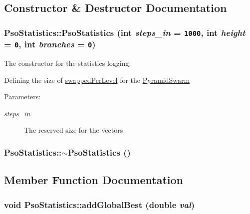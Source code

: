 \subsection{Constructor \& Destructor Documentation}
\hypertarget{classPsoStatistics_33694c00160dc114f263bd4bb53ad326}{
\subsubsection{\setlength{\rightskip}{0pt plus 5cm}PsoStatistics::PsoStatistics (int {\em steps\_\-in} = {\tt 1000}, \/  int {\em height} = {\tt 0}, \/  int {\em branches} = {\tt 0})}}
\label{classPsoStatistics_33694c00160dc114f263bd4bb53ad326}


The constructor for the statistics logging. 

Defining the size of \hyperlink{classPsoStatistics_77332ba8e781b613b82602e0ddbbe8fe}{swappedPerLevel} for the \hyperlink{classPyramidSwarm}{PyramidSwarm} \begin{Desc}
\item[Parameters: ]\par
\begin{description}
\item[{\em 
steps\_\-in}]The reserved size for the vectors \end{description}
\end{Desc}
\hypertarget{classPsoStatistics_4ac7c7d98d5b2e7f7f402ffae750e01d}{
\subsubsection{\setlength{\rightskip}{0pt plus 5cm}PsoStatistics::$\sim$PsoStatistics ()}}
\label{classPsoStatistics_4ac7c7d98d5b2e7f7f402ffae750e01d}




\subsection{Member Function Documentation}
\hypertarget{classPsoStatistics_1d3cbd813114a32bf18cc71c6a86251e}{
\subsubsection{\setlength{\rightskip}{0pt plus 5cm}void PsoStatistics::addGlobalBest (double {\em val})}}
\label{classPsoStatistics_1d3cbd813114a32bf18cc71c6a86251e}


